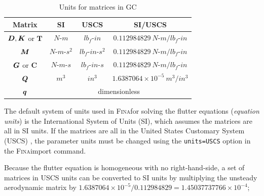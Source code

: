 \documentclass[10pt,openany,twoside]{book}
\numberwithin{equation}{section}   %
\newcommand{\Cmd}[1]{{\sf #1}}
\newcommand{\Newterm}[1]{{\em #1}}
\newcommand{\Code}[1]{{\small\tt #1}}
\newcommand{\Fina}{{\normalfont\scshape Fina\:}}
\newcommand{\Matrix}[1]{\boldsymbol{#1}}
\newcommand{\Vector}[1]{\boldsymbol{#1}}
\newcommand{\Gc}{GC}
\begin{document}
\begin{table}[hbt] %
\begin{center}
\begin{sloppypar}
\begin{tabular}{|c|c|c|c|} \hline
{\bf Matrix}       & {\bf SI }   & {\bf USCS}  & {\bf SI/USCS}     \\ \hline \hline
$\rule{0mm}{4mm} \Matrix{D}, \Matrix{K}$ or $\Matrix{T}$ & $N\text{-}m$ & $lb_f\text{-}in$ & $0.112984829 \: N\text{-}m/lb_f\text{-}in$  \\ \hline
$\rule{0mm}{4mm} \Matrix{M}$  & $N\text{-}m\text{-}s^2$         & $lb_f\text{-}in\text{-}s^2$ & $0.112984829 \: N\text{-}m/lb_f\text{-}in$  \\ \hline
$\rule{0mm}{4mm} \Matrix{G}$ or $\Matrix{C}$ & $N\text{-}m\text{-}s$ &
		$lb_f\text{-}in\text{-}s$ & $0.112984829 \: N\text{-}m/lb_f\text{-}in$ \\ \hline
$\rule{0mm}{4mm} \Matrix{Q}$     & $m^3$ & $in^3$ & $1.6387064 \times 10^{-5} \: m^3/in^3$     \\ \hline
$\rule{0mm}{4mm}\Vector{q}$ & \multicolumn{3}{c|}{dimensionless}                             \\ \hline
\end{tabular}
\end{sloppypar}
\caption{Units for matrices in \Gc} \label{table:matrix-units}
\end{center}
\end{table}



The default system of units used in \Fina for solving the flutter
equations (\Newterm{equation units}) is the International
System of Units (SI), which assumes the matrices are all in SI units.
If the matrices are all in the United States Customary System (USCS)
\cite{handbook2002specifications},
the parameter units must be changed using the \Code{units=USCS}
option in the \Fina \Cmd{import} command.

Because the flutter equation is homogeneous with no right-hand-side, a set
of matrices in USCS units can be converted to SI units by multiplying the unsteady
aerodynamic matrix by
$1.6387064\times10^{-5}/0.112984829 = 1.45037737766 \times 10^{-4}$;
\end{document}
